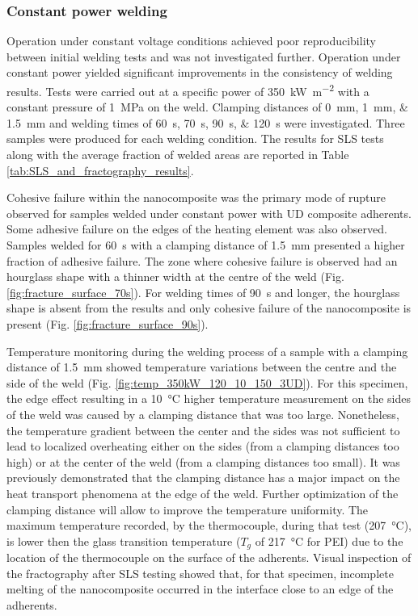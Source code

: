 \documentclass[11pt,review,times]{elsarticle}
\begin{document}
\subsubsection{Constant power welding}
\FloatBarrier

Operation under constant voltage conditions achieved poor reproducibility between initial welding tests and was not investigated further. 
Operation under constant power yielded significant improvements in the consistency of welding results. 
Tests were carried out at a specific power of \SI{350}{\kW\per\square\metre} with a constant pressure of \SI{1}{\MPa} on the weld. 
Clamping distances of \SIlist{0;1;1.5}{\mm} and welding times of \SIlist{60;70;90;120}{\s} were investigated. 
Three samples were produced for each welding condition. 
The results for SLS tests along with the average fraction of welded areas are reported in Table \ref{tab:SLS_and_fractography_results}. 

Cohesive failure within the nanocomposite was the primary mode of rupture observed for samples welded under constant power with UD composite adherents.
Some adhesive failure on the edges of the heating element was also observed. 
Samples welded for \SI{60}{\s} with a clamping distance of \SI{1.5}{\mm} presented a higher fraction of adhesive failure. 
The zone where cohesive failure is observed had an hourglass shape with a thinner width at the centre of the weld (Fig. \ref{fig:fracture_surface_70s}). 
For welding times of \SI{90}{\s} and longer, the hourglass shape is absent from the results and only cohesive failure of the nanocomposite is present (Fig. \ref{fig:fracture_surface_90s}). 

Temperature monitoring during the welding process of a sample with a clamping distance of \SI{1.5}{\mm} showed temperature variations between the centre and the side of the weld (Fig. \ref{fig:temp_350kW_120_10_150_3UD}).
For this specimen, the edge effect resulting in a \SI{10}{\celsius} higher temperature measurement on the sides of the weld was caused by a clamping distance that was too large. 
Nonetheless, the temperature gradient between the center and the sides was not sufficient to lead to localized overheating either on the sides (from a clamping distances too high) or at the center of the weld (from a clamping distances too small). 
It was previously demonstrated that the clamping distance has a major impact on the heat transport phenomena at the edge of the weld.
Further optimization of the clamping distance will allow to improve the temperature uniformity. 
The maximum temperature recorded, by the thermocouple, during that test (\SI{207}{\celsius}), is lower then the glass transition temperature ($T_g$ of \SI{217}{\celsius} for PEI) due to the location of the thermocouple on the surface of the adherents. 
Visual inspection of the fractography after SLS testing showed that, for that specimen, incomplete melting of the nanocomposite occurred in the interface close to an edge of the adherents. 
\end{document}
